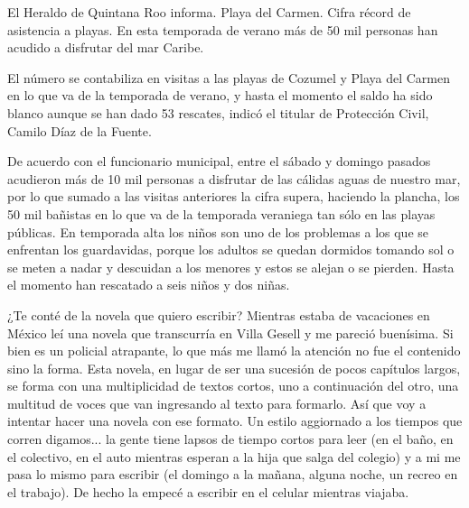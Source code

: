 \documentclass[11pt,twoside,openright,a6paper]{book}
\begin{document}
\vspace{0.5cm}
\hrulefill\hspace{0.2cm} \decofourleft\decofourright \hspace{0.2cm} \hrulefill
\vspace{0.5cm}

El Heraldo de Quintana Roo informa. Playa del Carmen. Cifra récord de
asistencia a playas. En esta temporada de verano más de 50 mil personas
han acudido a disfrutar del mar Caribe.

El número se contabiliza en visitas a las playas de Cozumel y Playa
del Carmen en lo que va de la temporada de verano, y hasta el momento el
saldo ha sido blanco aunque se han dado 53 rescates, indicó el titular de
Protección Civil, Camilo Díaz de la Fuente.

De acuerdo con el funcionario municipal, entre el sábado y domingo pasados
acudieron más de 10 mil personas a disfrutar de las cálidas aguas de
nuestro mar, por lo que sumado a las visitas anteriores la cifra supera,
haciendo la plancha, los 50 mil bañistas en lo que va de la temporada
veraniega tan sólo en las playas públicas.  En temporada alta los niños
son uno de los problemas a los que se enfrentan los guardavidas, porque
los adultos se quedan dormidos tomando sol o se meten a nadar y descuidan a
los menores y estos se alejan o se pierden. Hasta el momento han rescatado
a seis niños y dos niñas.


\vspace{0.5cm}
\hrulefill\hspace{0.2cm} \decofourleft\decofourright \hspace{0.2cm} \hrulefill
\vspace{0.5cm}

¿Te conté de la novela que quiero escribir? Mientras
estaba de vacaciones en México leí una novela que transcurría en Villa
Gesell y me pareció buenísima. Si bien es un policial atrapante, lo que
más me llamó la atención no fue el contenido sino la forma. Esta novela,
en lugar de ser una sucesión de pocos capítulos largos, se forma con una
multiplicidad de textos cortos, uno a continuación del otro, una multitud
de voces que van ingresando al texto para formarlo. Así que voy a intentar
hacer una novela con ese formato. Un estilo aggiornado a los tiempos que
corren digamos... la gente tiene lapsos de tiempo cortos para leer (en el
baño, en el colectivo, en el auto mientras esperan a la hija que salga del
colegio) y a mi me pasa lo mismo para escribir (el domingo a la mañana,
alguna noche, un recreo en el trabajo). De hecho la empecé a escribir en
el celular mientras viajaba.
\end{document}
